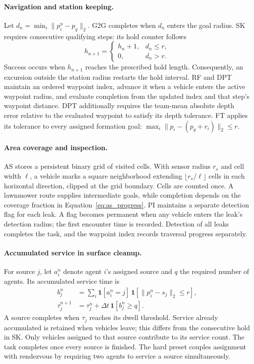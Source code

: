 \paragraph{Navigation and station keeping.}
Let $d_n=\min_i\|p_i^n-p_g\|_2$. G2G completes when $d_n$ enters the goal radius. SK requires consecutive qualifying steps: its hold counter follows
\begin{equation}
h_{n+1}=\begin{cases}h_n+1,&d_n\leq r,\\0,&d_n>r.\end{cases}
\end{equation}
Success occurs when $h_{n+1}$ reaches the prescribed hold length. Consequently, an excursion outside the station radius restarts the hold interval. RF and DPT maintain an ordered waypoint index, advance it when a vehicle enters the active waypoint radius, and evaluate completion from the updated index and that step's waypoint distance. DPT additionally requires the team-mean absolute depth error relative to the evaluated waypoint to satisfy its depth tolerance. FT applies its tolerance to every assigned formation goal: $\max_i\|p_i-(p_g+r_i)\|_2\leq r$.

\paragraph{Area coverage and inspection.}
AS stores a persistent binary grid of visited cells. With sensor radius $r_s$ and cell width $\ell$, a vehicle marks a square neighborhood extending $\lfloor r_s/\ell\rfloor$ cells in each horizontal direction, clipped at the grid boundary. Cells are counted once. A lawnmower route supplies intermediate goals, while completion depends on the coverage fraction in Equation~\ref{eq:as_progress}. PI maintains a separate detection flag for each leak. A flag becomes permanent when any vehicle enters the leak's detection radius; the first encounter time is recorded. Detection of all leaks completes the task, and the waypoint index records traversal progress separately.

\paragraph{Accumulated service in surface cleanup.}
For source $j$, let $a_i^n$ denote agent $i$'s assigned source and $q$ the required number of agents. Its accumulated service time is
\begin{align}
b_j^n&=\sum_i\mathbf 1[a_i^n=j]\,
                 \mathbf 1[\|p_i^n-s_j\|_2\leq r],\\
\tau_j^{n+1}&=\tau_j^n+\Delta t\,\mathbf 1[b_j^n\geq q].
\end{align}
A source completes when $\tau_j$ reaches its dwell threshold. Service already accumulated is retained when vehicles leave; this differs from the consecutive hold in SK. Only vehicles assigned to that source contribute to its service count. The task completes once every source is finished. The hard preset couples assignment with rendezvous by requiring two agents to service a source simultaneously.

